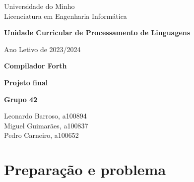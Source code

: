 \documentclass{article}
\begin{document}
\begin{titlepage}
    \centering
    
    {\small Universidade do Minho \\
    Licenciatura em Engenharia Informática \par}
    
    \vspace*{\fill} %

    {\huge\bfseries Unidade Curricular de Processamento de Linguagens \par}
    
    \vspace{0.5cm} %
    
    {\normalsize Ano Letivo de 2023/2024 \par}
    
    \vspace{1cm} %
    
    \hrulefill %
    
    \vspace{1cm} %
    
    {\huge\bfseries Compilador Forth \par}
    
    \vspace{0.5cm} %

    
    {\large\bfseries Projeto final \par}

    \vspace{1cm} %
    
    \hrulefill %
    
    \vspace{2cm} %

    {\bfseries Grupo 42 \\}
    {\normalsize Leonardo Barroso, a100894 \\ Miguel Guimarães, a100837 \\ Pedro Carneiro, a100652 \par}
    
    \vspace*{\fill} %
    
\end{titlepage}



\section{Preparação e problema}
\end{document}
